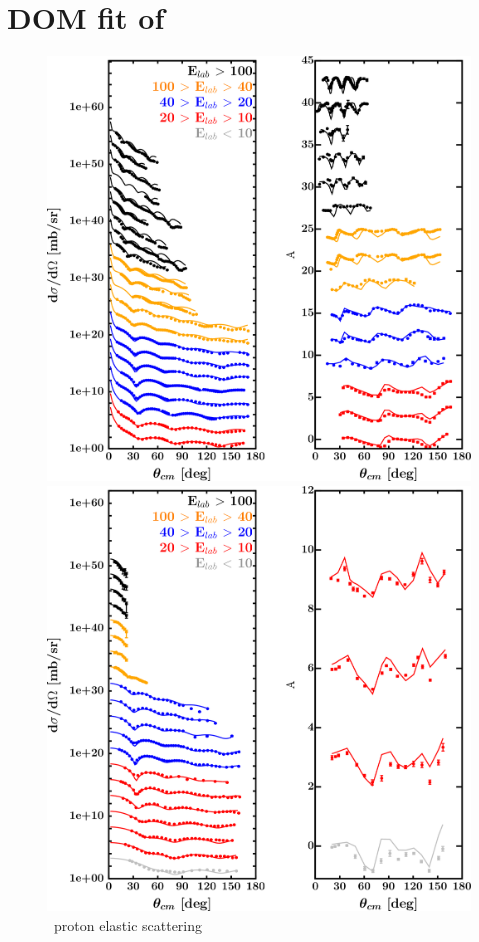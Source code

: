 \section{DOM fit of \caForty}
\label{ca40DOMOutput}
\begin{figure}[hbtp]
    \centering
    \begin{minipage}{0.47\textwidth}
        \centering
        \includegraphics[width=\textwidth]{figures/ca40_protonElastic.png}
        \caption*{\caForty\ proton elastic scattering}
        \label{DOMFitData_ca40_proton_elastic}
    \end{minipage}\hspace{6pt}
    \begin{minipage}{0.47\textwidth}
        \centering
        \includegraphics[width=\textwidth]{figures/ca40_neutronElastic.png}

\end{minipage}
\end{figure}
